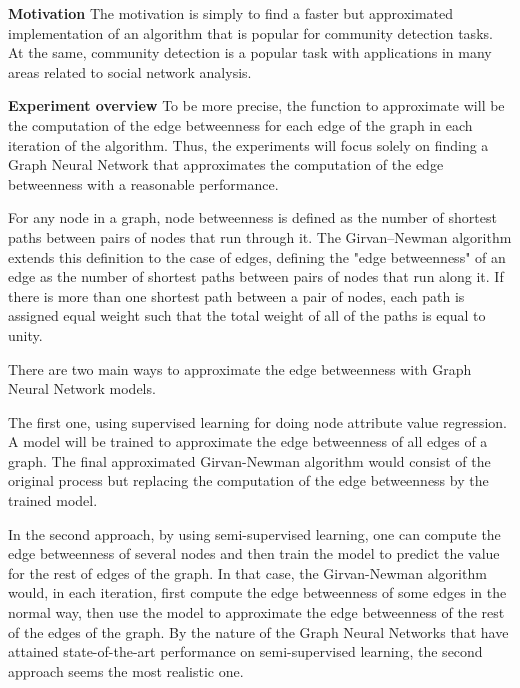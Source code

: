 \textbf{Motivation}
The motivation is simply to find a faster but approximated implementation of an algorithm that is popular for community detection tasks. At the same, community detection is a popular task with applications in many areas related to social network analysis.


\textbf{Experiment overview}
To be more precise, the function to approximate will be the computation of the edge betweenness for each edge of the graph in each iteration of the algorithm. Thus, the experiments will focus solely on finding a Graph Neural Network that approximates the computation of the edge betweenness with a reasonable performance.

For any node in a graph, node betweenness is defined as the number of shortest paths between pairs of nodes that run through it. The Girvan–Newman algorithm extends this definition to the case of edges, defining the "edge betweenness" of an edge as the number of shortest paths between pairs of nodes that run along it. If there is more than one shortest path between a pair of nodes, each path is assigned equal weight such that the total weight of all of the paths is equal to unity.

There are two main ways to approximate the edge betweenness with Graph Neural Network models. 

The first one, using supervised learning for doing node attribute value regression. A model will be trained to approximate the edge betweenness of all edges of a graph. The final approximated Girvan-Newman algorithm would consist of the original process but replacing the computation of the edge betweenness by the trained model.


In the second approach, by using semi-supervised learning, one can compute the edge betweenness of several nodes and then train the model to predict the value for the rest of edges of the graph. In that case, the Girvan-Newman algorithm would, in each iteration, first compute the edge betweenness of some edges in the normal way, then use the model to approximate the edge betweenness of the rest of the edges of the graph. By the nature of the Graph Neural Networks that have attained state-of-the-art performance on semi-supervised learning, the second approach seems the most realistic one.


